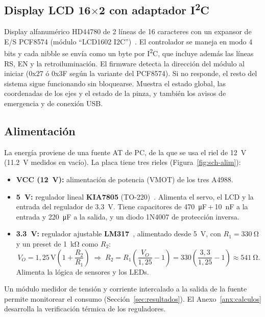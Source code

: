\subsection{Display LCD 16$\times$2 con adaptador I\textsuperscript{2}C}
Display alfanumérico HD44780 de 2 líneas de 16 caracteres con un expansor de E/S PCF8574
(módulo ``LCD1602 I2C'')~\cite{lcd1602}. El controlador se maneja en modo 4 bits y cada nibble
se envía como un byte por I\textsuperscript{2}C, que incluye además las líneas RS, EN y la
retroiluminación. El firmware detecta la dirección del módulo al iniciar (0x27 ó 0x3F según
la variante del PCF8574). Si no responde, el resto del sistema sigue funcionando sin
bloquearse. Muestra el estado global, las coordenadas de los ejes y el estado de la pinza, y
también los avisos de emergencia y de conexión USB.

\subsection{Alimentación}
La energía proviene de una fuente AT de PC, de la que se usa el riel de \SI{12}{\volt}
(\SI{11,2}{\volt} medidos en vacío). La placa tiene tres rieles (Figura~\ref{fig:sch-alim}):
\begin{itemize}
  \item \textbf{VCC (\SI{12}{\volt}):} alimentación de potencia (VMOT) de los tres A4988.
  \item \textbf{\SI{5}{\volt}:} regulador lineal \textbf{KIA7805} (TO-220)~\cite{kia7805}.
        Alimenta el servo, el LCD y la entrada del regulador de \SI{3,3}{\volt}. Tiene capacitores
        de \SI{470}{\micro\farad}\,+\,\SI{10}{\nano\farad} a la entrada y \SI{220}{\micro\farad}
        a la salida, y un diodo 1N4007 de protección inversa.
  \item \textbf{\SI{3,3}{\volt}:} regulador ajustable \textbf{LM317}~\cite{lm317}, alimentado desde
        \SI{5}{\volt}, con $R_1=\SI{330}{\ohm}$ y un preset de \SI{1}{\kilo\ohm} como $R_2$:
        \begin{equation}
          V_{O} = 1{,}25\,\mathrm{V}\left(1+\frac{R_2}{R_1}\right)
          \;\Rightarrow\;
          R_2 = R_1\!\left(\frac{V_O}{1{,}25} - 1\right) = 330\left(\frac{3{,}3}{1{,}25}-1\right)\approx\SI{541}{\ohm}.
        \end{equation}
        Alimenta la lógica de sensores y los LEDs.
\end{itemize}
Un módulo medidor de tensión y corriente intercalado a la salida de la fuente permite
monitorear el consumo (Sección~\ref{sec:resultados}). El Anexo~\ref{anx:calculos} desarrolla
la verificación térmica de los reguladores.

